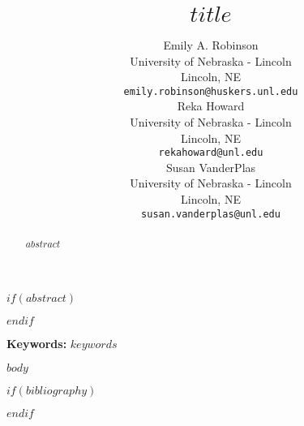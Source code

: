 \documentclass[10pt]{article}
\title{$title$}
\author{
  Emily A. Robinson \\
  \small{University of Nebraska - Lincoln}\\
  \small{Lincoln, NE} \\
  \small{\tt emily.robinson@huskers.unl.edu} \\\And
 Reka Howard \\
  \small{University of Nebraska - Lincoln}\\
  \small{Lincoln, NE} \\
  \small{\tt rekahoward@unl.edu} \\\And
  Susan VanderPlas \\
  \small{University of Nebraska - Lincoln}\\
  \small{Lincoln, NE} \\
  \small{\tt susan.vanderplas@unl.edu} \\}
\date{}
\begin{document}
\maketitle
$if(abstract)$
\begin{abstract}
$abstract$
\end{abstract}
$endif$

{\bf Keywords:} $keywords$

$body$


$if(bibliography)$

$endif$
% 
\end{document}
